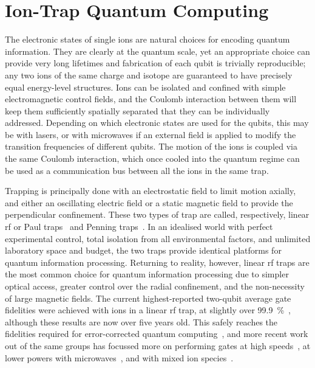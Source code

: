 \chapter{Ion-Trap Quantum Computing}
\label{sec:iontrap}

The electronic states of single ions are natural choices for encoding quantum information.
They are clearly at the quantum scale, yet an appropriate choice can provide very long lifetimes and fabrication of each qubit is trivially reproducible; any two ions of the same charge and isotope are guaranteed to have precisely equal energy-level structures.
Ions can be isolated and confined with simple electromagnetic control fields, and the Coulomb interaction between them will keep them sufficiently spatially separated that they can be individually addressed.
Depending on which electronic states are used for the qubits, this may be with lasers, or with microwaves if an external field is applied to modify the transition frequencies of different qubits.
The motion of the ions is coupled via the same Coulomb interaction, which once cooled into the quantum regime can be used as a communication bus between all the ions in the same trap.

Trapping is principally done with an electrostatic field to limit motion axially, and either an oscillating electric field or a static magnetic field to provide the perpendicular confinement.
These two types of trap are called, respectively, linear rf or Paul traps~\cite{Paul1990} and Penning traps~\cite{Dehmelt1968}.
In an idealised world with perfect experimental control, total isolation from all environmental factors, and unlimited laboratory space and budget, the two traps provide identical platforms for quantum information processing.
Returning to reality, however, linear rf traps are the most common choice for quantum information processing due to simpler optical access, greater control over the radial confinement, and the non-necessity of large magnetic fields.
The current highest-reported two-qubit average gate fidelities were achieved with ions in a linear rf trap, at slightly over \SI{99.9}{\percent}~\cite{Ballance2016,Gaebler2016}, although these results are now over five years old.
This safely reaches the fidelities required for error-corrected quantum computing~\cite{Bermudez2017}, and more recent work out of the same groups has focussed more on performing gates at high speeds~\cite{Schaefer2018}, at lower powers with microwaves~\cite{Srinivas2021}, and with mixed ion species~\cite{Hughes2020}.


